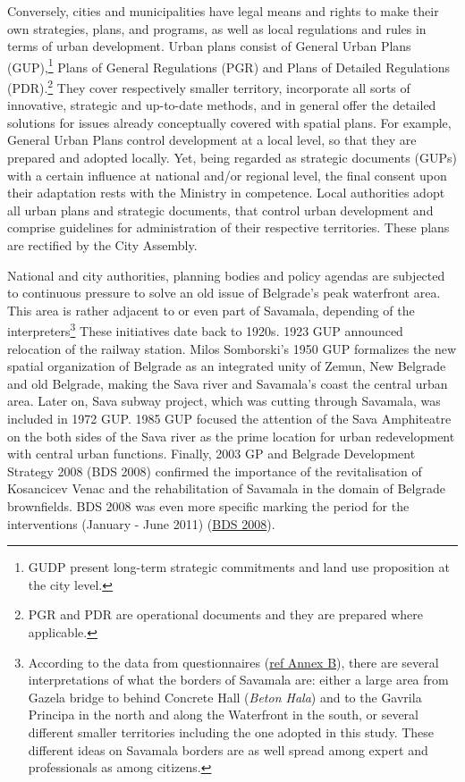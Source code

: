 \documentclass[11pt]{report}
\begin{document}
\begin{itemize}
Conversely, cities and municipalities have legal means and rights to make their own strategies, plans, and programs, as well as local regulations and rules in terms of urban development.
Urban plans consist of General Urban Plans (GUP),\footnote{GUDP present long-term strategic commitments and land use proposition at the city level.} Plans of General Regulations (PGR) and Plans of Detailed Regulations (PDR).\footnote{PGR and PDR are operational documents and they are prepared where applicable.}
They cover respectively smaller territory, incorporate all sorts of innovative, strategic and up-to-date methods, and in general offer the detailed solutions for issues already conceptually covered with spatial plans.
For example, General Urban Plans control development at a local level, so that they are prepared and adopted locally.
Yet, being regarded as strategic documents (GUPs) with a certain influence at national and/or regional level, the final consent upon their adaptation rests with the Ministry in competence.
Local authorities adopt all urban plans and strategic documents, that control urban development and comprise guidelines for administration of their respective territories.
These plans are rectified by the City Assembly.

National and city authorities, planning bodies and policy agendas are subjected to continuous pressure to solve an old issue of Belgrade’s peak waterfront area.
This area is rather adjacent to or even part of Savamala, depending of the interpreters\footnote{According to the data from questionnaires (\href{ref}{ref Annex B}), there are several interpretations of what the borders of Savamala are: either a large area from Gazela bridge to behind Concrete Hall (\textit{Beton Hala}) and to the Gavrila Principa in the north and along the Waterfront in the south, or several different smaller territories including the one adopted in this study. These different ideas on Savamala borders are as well spread among expert and professionals as among citizens.}
These initiatives date back to 1920s.
1923 GUP announced relocation of the railway station.
Milos Somborski's 1950 GUP formalizes the new spatial organization of Belgrade as an integrated unity of Zemun, New Belgrade and old Belgrade, making the Sava river and Savamala's coast the central urban area.
Later on, Sava subway project, which was cutting through Savamala, was included in 1972 GUP.
1985 GUP focused the attention of the Sava Amphiteatre on the both sides of the Sava river as the prime location for urban redevelopment with central urban functions.
Finally, 2003 GP and Belgrade Development Strategy 2008 (BDS 2008) confirmed the importance of the revitalisation of Kosancicev Venac and the rehabilitation of Savamala in the domain of Belgrade brownfields. BDS 2008 was even more specific marking the period for the interventions (January - June 2011) (\href{ref}{BDS 2008}).
\\


\end{itemize}
\end{document}

